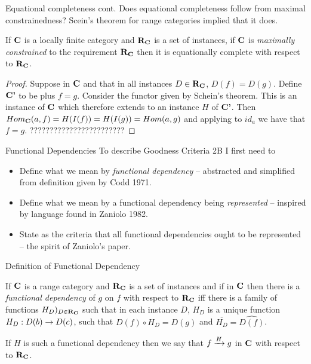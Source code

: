 \begin{frame}{Equational completeness cont. }
Does equational completeness follow from maximal constrainedness?
Scein's theorem for range categories implied that it does.
\begin{lemma}
If $\catc$ is a locally finite category and $\reqtc$ is a set of instances, if $\catc$ 
 is
\textit{maximally constrained} to the requirement $\reqtc$ then it is equationally
complete with respect to $\reqtc$.
\end{lemma}
\begin{proof}
Suppose \fgparalleldiagram  in $\catc$ and that in all instances $D \in \reqtc$, $D(f)=D(g)$. 
Define $\catcp$ to be \catc plus $f=g$. Consider the functor given by Schein's theorem.
This is an instance of $\catc$ which therefore extends to an instance $H$ of $\catcp$.  Then
$Hom_{\catc}(a,f)=H(I(f))=H(I(g))=Hom(a,g)$ and applying to $id_a$ we have that $f=g$.
????????????????????????
\end{proof}
\end{frame}


\begin{frame}{Functional Dependencies}
To describe Goodness Criteria 2B I first need to
\begin{itemize}
\item Define what we mean by \textit{functional dependency}
-- abstracted and simplified from definition given by Codd 1971.
\item Define what we mean by a functional dependency being \textit{represented}
-- inspired by language found in Zaniolo 1982.
\item State as the criteria that all functional dependencies ought to be represented -- 
the spirit of Zaniolo's paper. 
\end{itemize}
\end{frame}

\begin{frame}{Definition of Functional Dependency}
\begin{definition}
If $\catc$ is a range category and $\reqtc$ is a set of instances and if \fgsourcediag
in $\catc$ then there is a  \textit{functional dependency} of $g$ on $f$ with respect to $\reqtc$ iff
there is a family of functions $H_D)_{D \in \reqtc}$ such that 
in each instance $D$, $H_D$ is a unique function $H_D: D(b) \morph D(c)$, such that $D(f) \circ H_D = D(g)$ and $\overline{H_D}=\widehat{D(f)}$.
\end{definition}
\pause If $H$ is such a functional dependency then we say that $\fundep{H}{f}{g}$ in $\catc$ with respect to $\reqtc$.
\end{frame}

